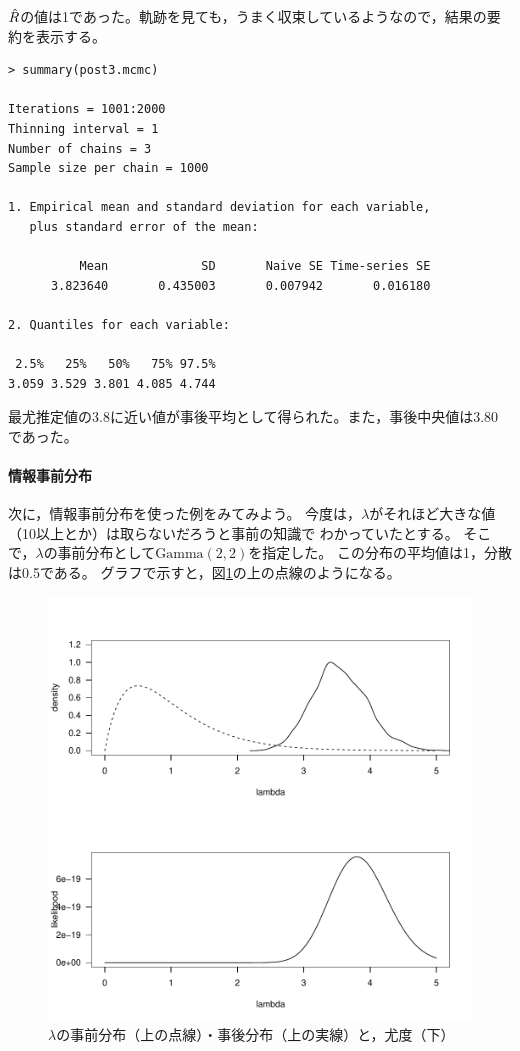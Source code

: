 \documentclass[11pt,uplatex]{jsarticle}
\begin{document}
$\Hat{R}$の値は1であった。軌跡を見ても，うまく収束しているようなので，結果の要約を表示する。

\begin{lstlisting}
> summary(post3.mcmc)

Iterations = 1001:2000
Thinning interval = 1 
Number of chains = 3 
Sample size per chain = 1000 

1. Empirical mean and standard deviation for each variable,
   plus standard error of the mean:

          Mean             SD       Naive SE Time-series SE 
      3.823640       0.435003       0.007942       0.016180 

2. Quantiles for each variable:

 2.5%   25%   50%   75% 97.5% 
3.059 3.529 3.801 4.085 4.744 

\end{lstlisting}

最尤推定値の3.8に近い値が事後平均として得られた。また，事後中央値は3.80であった。

\paragraph{情報事前分布}

次に，情報事前分布を使った例をみてみよう。
今度は，$\lambda$がそれほど大きな値（10以上とか）は取らないだろうと事前の知識で
わかっていたとする。
そこで，$\lambda$の事前分布として$\mathrm{Gamma}(2, 2)$を指定した。
この分布の平均値は1，分散は0.5である。
グラフで示すと，図\ref{prior_posterior}の上の点線のようになる。

\begin{figure}[htbp]
	\begin{center}
		\includegraphics[bb=0 0 480 480, clip, width=320 bp]{example1-4.pdf}
	\end{center}
	\caption{$\lambda$の事前分布（上の点線）・事後分布（上の実線）と，尤度（下）}
	\label{prior_posterior}
\end{figure}
\end{document}
